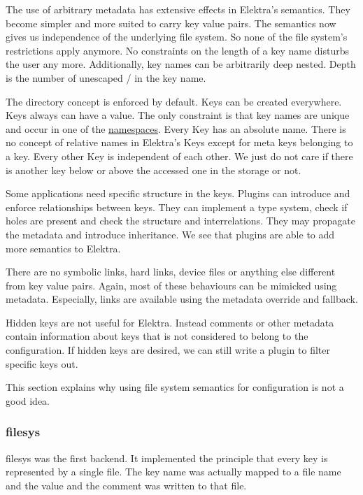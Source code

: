 The use of arbitrary metadata has extensive effects in Elektra's semantics. They become simpler and more suited to carry key value pairs. The semantics now gives us independence of the underlying file system. So none of the file system's restrictions apply anymore. No constraints on the length of a key name disturbs the user any more. Additionally, key names can be arbitrarily deep nested. Depth is the number of unescaped {\ttfamily /} in the key name.

The directory concept is enforced by default. Keys can be created everywhere. Keys always can have a value. The only constraint is that key names are unique and occur in one of the \hyperlink{md_doc_help_elektra-namespaces_doc_help_elektra-namespaces_md}{namespaces}. Every Key has an absolute name. There is no concept of relative names in Elektra's Keys except for meta keys belonging to a key. Every other Key is independent of each other. We just do not care if there is another key below or above the accessed one in the storage or not.

Some applications need specific structure in the keys. Plugins can introduce and enforce relationships between keys. They can implement a type system, check if holes are present and check the structure and interrelations. They may propagate the metadata and introduce inheritance. We see that plugins are able to add more semantics to Elektra.

There are no symbolic links, hard links, device files or anything else different from key value pairs. Again, most of these behaviours can be mimicked using metadata. Especially, links are available using the metadata {\ttfamily override} and {\ttfamily fallback}.

Hidden keys are not useful for Elektra. Instead comments or other metadata contain information about keys that is not considered to belong to the configuration. If hidden keys are desired, we can still write a plugin to filter specific keys out.

This section explains why using file system semantics for configuration is not a good idea.

\subsubsection*{filesys}

{\ttfamily filesys} was the first backend. It implemented the principle that every key is represented by a single file. The key name was actually mapped to a file name and the value and the comment was written to that file.

